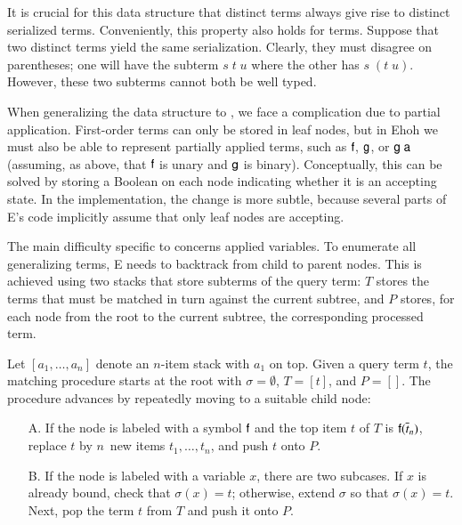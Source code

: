 It is crucial for this data structure that distinct terms always give rise to
distinct serialized terms. Conveniently, this property also holds for \lfhol{}
terms. Suppose that two distinct \lfhol{} terms yield the same serialization.
Clearly, they must disagree on parentheses; one will have the subterm $s\; t\;
u$ where the other has $s\; (t\; u).$ However, these two subterms cannot both
be well typed.

When generalizing the data structure to \lfhol, we face a complication
due to partial application. First-order terms can only be stored in leaf nodes,
but in Ehoh we must also be able to represent partially applied terms,
such as $\mathsf{f}$, $\mathsf{g}$, or $\mathsf{g}\;\mathsf{a}$ (assuming, as above, that
$\mathsf{f}$ is unary and $\mathsf{g}$ is binary). Conceptually, this can be solved
by storing a Boolean on each node indicating whether it is an accepting state.
In the implementation, the change is more subtle, because several parts of E's
code implicitly assume that only leaf nodes are accepting.

\newcommand\TermStack{\ensuremath{T}}
\newcommand\BTStack{\ensuremath{P}}

The main difficulty specific to \lfhol{} concerns applied variables. To
enumerate all generalizing terms, E needs to backtrack from child to
parent nodes. This is achieved using two stacks that store subterms of
the query term:
\TermStack{} %
stores the terms that
must be matched in turn against the
current subtree, and
\BTStack{} %
stores, for each node from
the root to the current subtree, the corresponding processed term.

Let $[a_1, \dots, a_n]$ denote an $n$-item stack with $a_1$ on top. Given a
query term $t$, the matching procedure starts at the root with $\sigma =
\emptyset$, $\TermStack{} = [t]$, and $\BTStack = []$.
%
The procedure advances by repeatedly moving to a suitable child node:
%
\begin{enumerate}
\item[A.] If the node is labeled with a symbol $\mathsf{f}$ and the top item
  $t$ of \TermStack{} is $\mathsf{f}(\overline{t}_{n})$,
  replace $t$ by $n$~new items $t_1,\dots,t_n$, and push $t$ onto \BTStack.

\smallskip
\item[B.] If the node is labeled with a variable $x$, there are two subcases.
  If $x$ is already bound, check that $\sigma(x) = t$;
  otherwise, extend $\sigma$ so that $\sigma(x) = t.$ Next, pop the term $t$
  from \TermStack{} and push it onto \BTStack.
\end{enumerate}

